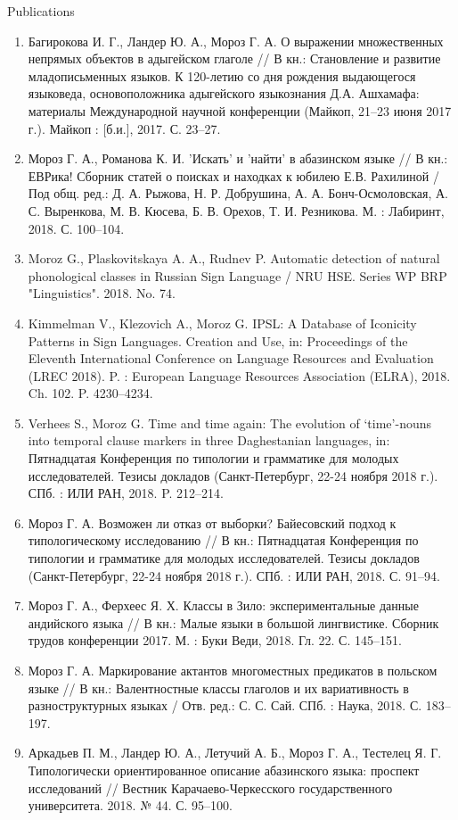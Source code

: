 \documentclass{resume} %
\begin{document}
\begin{rSection}{Publications}
\begin{enumerate}
\item Багирокова И. Г., Ландер Ю. А., Мороз Г. А. О выражении множественных непрямых объектов в адыгейском глаголе // В кн.: Становление и развитие младописьменных языков. К 120-летию со дня рождения выдающегося языковеда, основоположника адыгейского языкознания Д.А. Ашхамафа: материалы Международной научной конференции (Майкоп, 21--23 июня 2017 г.). Майкоп : [б.и.], 2017. С. 23--27.
\item  Мороз Г. А., Романова К. И. 'Искать' и 'найти' в абазинском языке // В кн.: ЕВРика! Сборник статей о поисках и находках к юбилею Е.В. Рахилиной / Под общ. ред.: Д. А. Рыжова, Н. Р. Добрушина, А. А. Бонч-Осмоловская, А. С. Выренкова, М. В. Кюсева, Б. В. Орехов, Т. И. Резникова. М. : Лабиринт, 2018. С. 100--104.
\item Moroz G., Plaskovitskaya A. A., Rudnev P. Automatic detection of natural phonological classes in Russian Sign Language / NRU HSE. Series WP BRP "Linguistics". 2018. No. 74.
\item Kimmelman V., Klezovich A., Moroz G. IPSL: A Database of Iconicity Patterns in Sign Languages. Creation and Use, in: Proceedings of the Eleventh International Conference on Language Resources and Evaluation (LREC 2018). P. : European Language Resources Association (ELRA), 2018. Ch. 102. P. 4230--4234.
\item Verhees S., Moroz G. Time and time again: The evolution of ‘time’-nouns into temporal clause markers in three Daghestanian languages, in: Пятнадцатая Конференция по типологии и грамматике для молодых исследователей. Тезисы докладов (Санкт-Петербург, 22-24 ноября 2018 г.). СПб. : ИЛИ РАН, 2018. P. 212--214.
\item Мороз Г. А. Возможен ли отказ от выборки? Байесовский подход к типологическому исследованию // В кн.: Пятнадцатая Конференция по типологии и грамматике для молодых исследователей. Тезисы докладов (Санкт-Петербург, 22-24 ноября 2018 г.). СПб. : ИЛИ РАН, 2018. С. 91--94.
\item Мороз Г. А., Ферхеес Я. Х. Классы в Зило: экспериментальные данные андийского языка // В кн.: Малые языки в большой лингвистике. Сборник трудов конференции 2017. М. : Буки Веди, 2018. Гл. 22. С. 145--151.
\item Мороз Г. А. Маркирование актантов многоместных предикатов в польском языке // В кн.: Валентностные классы глаголов и их вариативность в разноструктурных языках / Отв. ред.: С. С. Сай. СПб. : Наука, 2018. С. 183--197.
\item Аркадьев П. М., Ландер Ю. А., Летучий А. Б., Мороз Г. А., Тестелец Я. Г. Типологически ориентированное описание абазинского языка: проспект исследований // Вестник Карачаево-Черкесского государственного университета. 2018. № 44. С. 95--100.

\end{enumerate}
\end{rSection}
\end{document}
